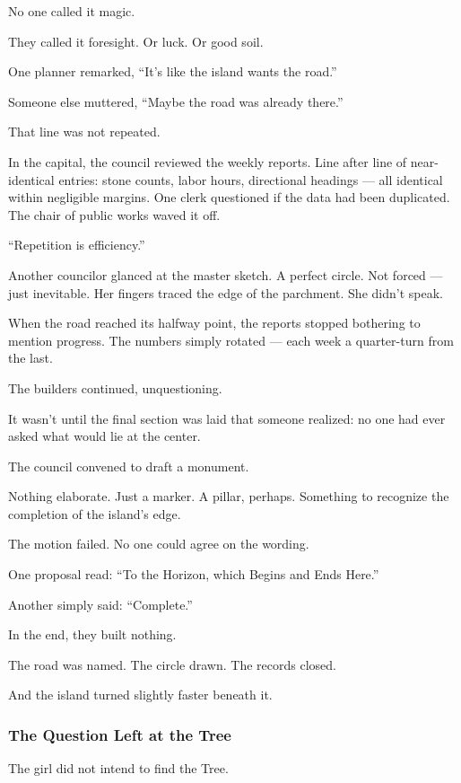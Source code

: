 \documentclass[12pt]{article}
\begin{document}
No one called it magic.

They called it foresight. Or luck. Or good soil.

One planner remarked, ``It’s like the island wants the road.''

Someone else muttered, ``Maybe the road was already there.''

That line was not repeated.

In the capital, the council reviewed the weekly reports. Line after line of near-identical entries: stone counts, labor hours, directional headings — all identical within negligible margins. One clerk questioned if the data had been duplicated. The chair of public works waved it off.

``Repetition is efficiency.''

Another councilor glanced at the master sketch. A perfect circle. Not forced — just inevitable. Her fingers traced the edge of the parchment. She didn’t speak.

When the road reached its halfway point, the reports stopped bothering to mention progress. The numbers simply rotated — each week a quarter-turn from the last.

The builders continued, unquestioning.

It wasn’t until the final section was laid that someone realized: no one had ever asked what would lie at the center.

The council convened to draft a monument.

Nothing elaborate. Just a marker. A pillar, perhaps. Something to recognize the completion of the island’s edge.

The motion failed. No one could agree on the wording.

One proposal read: ``To the Horizon, which Begins and Ends Here.''

Another simply said: ``Complete.''

In the end, they built nothing.

The road was named. The circle drawn. The records closed.

And the island turned slightly faster beneath it.


\dotfill

\subsubsection*{The Question Left at the Tree}

The girl did not intend to find the Tree.
\end{document}
